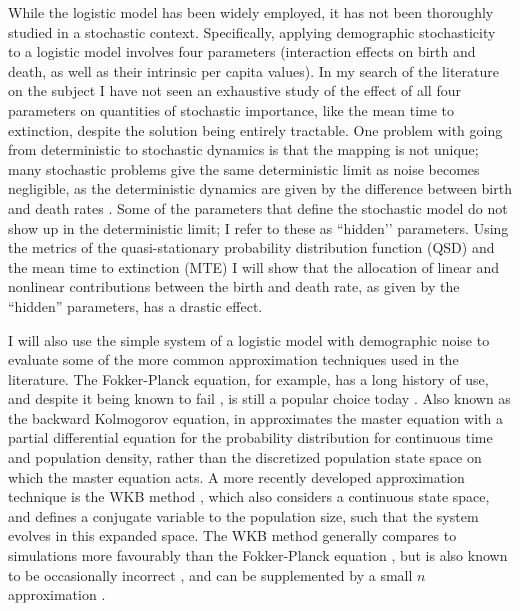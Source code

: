 While the logistic model has been widely employed, it has not been thoroughly studied in a stochastic context. 
Specifically, applying demographic stochasticity to a logistic model involves four parameters (interaction effects on birth and death, as well as their intrinsic per capita values). 
In my search of the literature on the subject I have not seen an exhaustive study of the effect of all four parameters on quantities of stochastic importance, like the mean time to extinction, despite the solution being entirely tractable. 
%
One problem with going from deterministic to stochastic dynamics is that the mapping is not unique; many stochastic problems give the same deterministic limit as noise becomes negligible, as the deterministic dynamics are given by the difference between birth and death rates \cite{Nisbet1982,Norden1982,Nasell2001,Rouzine2001,Gardiner2004a}. 
Some of the parameters that define the stochastic model do not show up in the deterministic limit; I refer to these as ``hidden’’ parameters. 
Using the metrics of the quasi-stationary probability distribution function (QSD) and the mean time to extinction (MTE) I will show that the allocation of linear and nonlinear contributions between the birth and death rate, as given by the ``hidden'' parameters, has a drastic effect. %

I will also use the simple system of a logistic model with demographic noise to evaluate some of the more common approximation techniques used in the literature. 
The Fokker-Planck equation, for example, has a long history of use, and despite it being known to fail \cite{Grasman1983,Doering2005}, is still a popular choice today \cite{two million}. 
Also known as the backward Kolmogorov equation, in approximates the master equation with a partial differential equation for the probability distribution for continuous time and population density, rather than the discretized population state space on which the master equation acts. 
A more recently developed approximation technique is the WKB method \cite{a million}, which also considers a continuous state space, and defines a conjugate variable to the population size, such that the system evolves in this expanded space. 
The WKB method generally compares to simulations more favourably than the Fokker-Planck equation \cite{Yu2017}, but is also known to be occasionally incorrect \cite{Assaf2010}, and can be supplemented by a small $n$ approximation \cite{Gardiner2004a,Assaf2010}. 

